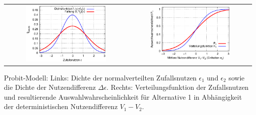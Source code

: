\documentclass[a4paper]{foils}
\begin{document}
\begin{landscape}
\begin{center}
\newpage
\vspace{1em}
\begin{tabular}{cc}
 \includegraphics[width=0.68\textwidth]{./figsDiscr/fGauss.eps} &  
 \includegraphics[width=0.68\textwidth]{./figsDiscr/binProbit_P1.eps}   
\end{tabular}

\parbox{1.1\textwidth}{Probit-Modell: Links: Dichte der 
normalverteilten Zufallsnutzen $\epsilon_1$ und $\epsilon_2$ sowie die
Dichte der Nutzendifferenz $\Delta \epsilon$. Rechts:
Verteilungsfunktion der Zufallsnutzen und resultierende
Auswahlwahrscheinlichkeit f\"ur Alternative 1 in Abh\"angigkeit der
deterministischen Nutzendifferenz $V_1-V_2$.
}
\newpage

\vspace{1em}


\end{center}
\end{landscape}
\end{document}
